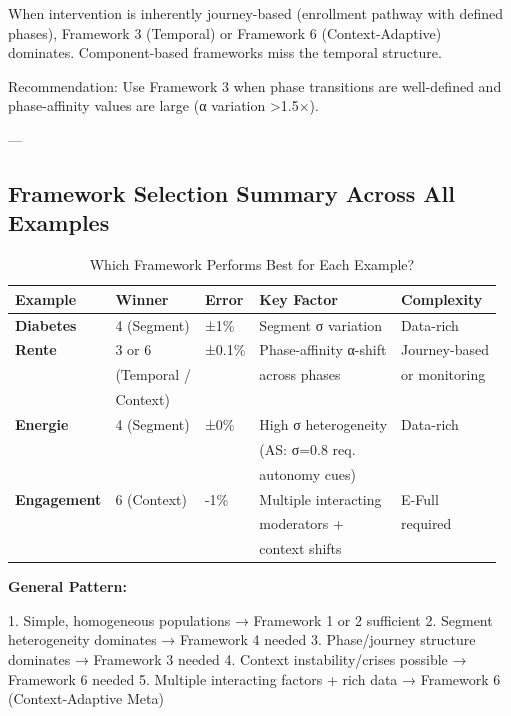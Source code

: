 When intervention is inherently journey-based (enrollment pathway with defined phases), Framework 3 (Temporal) or Framework 6 (Context-Adaptive) dominates. Component-based frameworks miss the temporal structure.

Recommendation: Use Framework 3 when phase transitions are well-defined and phase-affinity values are large (α variation >1.5×).

---

\subsection{Framework Selection Summary Across All Examples}

\begin{table}[htbp]
\centering
\caption{Which Framework Performs Best for Each Example?}
\label{tab:20-framework-winners}
\renewcommand{\arraystretch}{1.4}
\small
\begin{tabular}{@{}lllll@{}}
\toprule
\textbf{Example} & \textbf{Winner} & \textbf{Error} & \textbf{Key Factor} & \textbf{Complexity} \\
\midrule
\textbf{Diabetes} & 4 (Segment) & ±1\% & Segment σ variation & Data-rich \\
\midrule
\textbf{Rente} & 3 or 6 & ±0.1\% & Phase-affinity α-shift & Journey-based \\
& (Temporal / & & across phases & or monitoring \\
& Context) & & & \\
\midrule
\textbf{Energie} & 4 (Segment) & ±0\% & High σ heterogeneity & Data-rich \\
& & & (AS: σ=0.8 req. & \\
& & & autonomy cues) & \\
\midrule
\textbf{Engagement} & 6 (Context) & -1\% & Multiple interacting & E-Full \\
& & & moderators + & required \\
& & & context shifts & \\
\bottomrule
\end{tabular}
\end{table}

\textbf{General Pattern:}

1. Simple, homogeneous populations → Framework 1 or 2 sufficient
2. Segment heterogeneity dominates → Framework 4 needed
3. Phase/journey structure dominates → Framework 3 needed
4. Context instability/crises possible → Framework 6 needed
5. Multiple interacting factors + rich data → Framework 6 (Context-Adaptive Meta)

